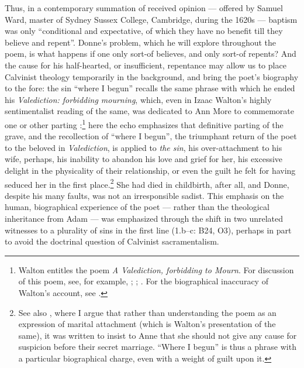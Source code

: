 \begin{paper}
Thus, in a contemporary summation of received opinion --- offered by
Samuel Ward, master of Sydney Sussex College, Cambridge, during the
1620s --- baptism was only ``conditional and expectative, of which they
have no benefit till they believe and repent''. Donne's problem, which
he will explore throughout the poem, is what happens if one only sort-of
believes, and only sort-of repents? And the cause for his half-hearted,
or insufficient, repentance may allow us to place Calvinist theology
temporarily in the background, and bring the poet's biography to the
fore: the sin ``where I begun'' recalls the same phrase with which he
ended his \emph{Valediction: forbidding mourning}, which, even in Izaac
Walton's highly sentimentalist reading of the same, was dedicated to Ann
More to commemorate one or other parting \citep[33--34]{walton_lives_1675}:\footnote{Walton entitles the poem \emph{A Valediction, forbidding to
  Mourn}. For discussion of this poem, see, for example, \citealt[118]{smith_john_1983}; \citealt[97--98]{mccolley_poetry_nodate}; \citealt[75--76]{targoff_john_2008}. For the biographical
  inaccuracy of Walton's account, see \citealt[41 note \emph{m}]{walton_lives_1807}.}
here the echo emphasizes that definitive parting of the grave, and the
recollection of ``where I begun'', the triumphant return of the poet to
the beloved in \emph{Valediction}, is applied to \emph{the sin}, his
over-attachment to his wife, perhaps, his inability to abandon his love
and grief for her, his excessive delight in the physicality of their
relationship, or even the guilt he felt for having seduced her in the
first place.\footnote{See also \citealt{lappin_baroquely_2019}, where I argue that rather than
  understanding the poem as an expression of marital attachment (which
  is Walton's presentation of the same), it was written to insist to
  Anne that she should not give any cause for suspicion before their
  secret marriage. ``Where I begun'' is thus a phrase with a particular
  biographical charge, even with a weight of guilt upon it.} She had
died in childbirth, after all, and Donne, despite his many faults, was
not an irresponsible sadist. This emphasis on the human, biographical
experience of the poet --- rather than the theological inheritance from
Adam --- was emphasized through the shift in two unrelated witnesses to
a plurality of sins in the first line (1.b--c: B24, O3), perhaps in part
to avoid the doctrinal question of Calvinist sacramentalism.


\end{paper}

